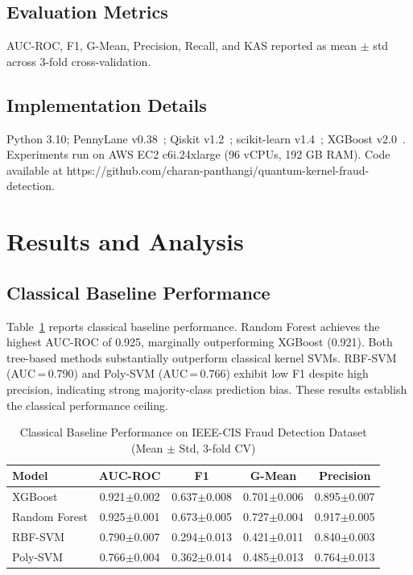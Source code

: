 \documentclass[journal]{IEEEtran}
\begin{document}
\subsection{Evaluation Metrics}
AUC-ROC, F1, G-Mean, Precision, Recall, and KAS reported 
as mean $\pm$ std across 3-fold cross-validation.

\subsection{Implementation Details}
Python 3.10; PennyLane v0.38~\cite{pennylane2018}; 
Qiskit v1.2~\cite{qiskit2023}; scikit-learn 
v1.4~\cite{sklearn2011}; XGBoost v2.0~\cite{chen2016xgboost}. 
Experiments run on AWS EC2 c6i.24xlarge (96 vCPUs, 192 GB RAM). 
Code available at https://github.com/charan-panthangi/quantum-kernel-fraud-detection.

\section{Results and Analysis}
\label{sec:results}

\subsection{Classical Baseline Performance}
Table~\ref{tab:classical_results} reports classical 
baseline performance. Random Forest achieves the highest 
AUC-ROC of 0.925, marginally outperforming XGBoost (0.921). 
Both tree-based methods substantially outperform classical 
kernel SVMs. RBF-SVM (AUC\,=\,0.790) and Poly-SVM 
(AUC\,=\,0.766) exhibit low F1 despite high precision, 
indicating strong majority-class prediction bias. These 
results establish the classical performance ceiling.

\begin{table}[h]
\caption{Classical Baseline Performance on IEEE-CIS 
Fraud Detection Dataset (Mean $\pm$ Std, 3-fold CV)}
\label{tab:classical_results}
\centering
\begin{tabular}{lcccc}
\toprule
\textbf{Model} & \textbf{AUC-ROC} & \textbf{F1} & 
\textbf{G-Mean} & \textbf{Precision} \\
\midrule
XGBoost       & 0.921$\pm$0.002 & 0.637$\pm$0.008 & 0.701$\pm$0.006 & 0.895$\pm$0.007 \\
Random Forest & 0.925$\pm$0.001 & 0.673$\pm$0.005 & 0.727$\pm$0.004 & 0.917$\pm$0.005 \\
RBF-SVM       & 0.790$\pm$0.007 & 0.294$\pm$0.013 & 0.421$\pm$0.011 & 0.840$\pm$0.003 \\
Poly-SVM      & 0.766$\pm$0.004 & 0.362$\pm$0.014 & 0.485$\pm$0.013 & 0.764$\pm$0.013 \\
\bottomrule
\end{tabular}
\end{table}
\end{document}
